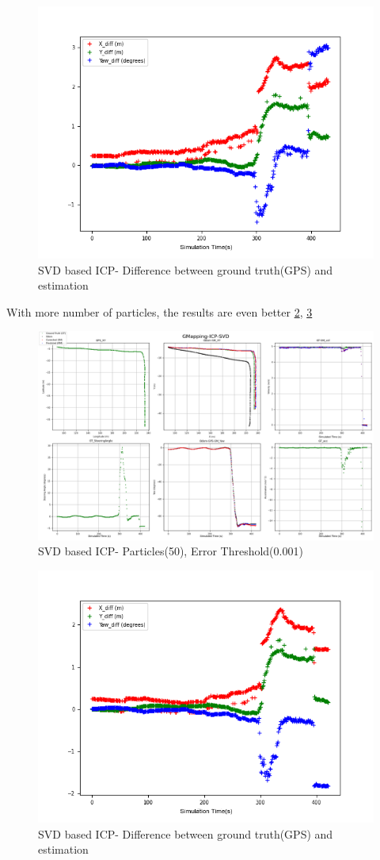     \begin{figure}[h] 
        \includegraphics[height=0.4\textwidth]{images/GMapping-ICP-SVD_True_vs_Crct_20_0.001.png}
        \caption{SVD based ICP- Difference between ground truth(GPS) and estimation}
        \label{fig:SVD_20_0.001_diff}
    \end{figure}
\clearpage
With more number of particles, the results are even better \ref{fig:SVD_50_0.001}, \ref{fig:SVD_50_0.001_diff}
    \begin{figure}[h] 
        \includegraphics[height=0.6\textwidth]{images/GMapping-ICP-SVD_Map_50_0.001.png}
        \caption{SVD based ICP- Particles(50), Error Threshold(0.001)}
        \label{fig:SVD_50_0.001}
    \end{figure}
    \begin{figure}[h] 
        \includegraphics[height=0.4\textwidth]{images/GMapping-ICP-SVD_True_vs_Crct_50_0.001.png}
        \caption{SVD based ICP- Difference between ground truth(GPS) and estimation}
        \label{fig:SVD_50_0.001_diff}
    \end{figure}
\clearpage

